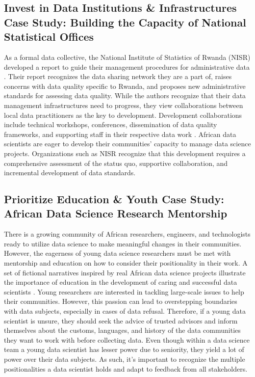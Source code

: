 \subsection{Invest in Data Institutions \& Infrastructures Case Study: Building the Capacity of National Statistical Offices}
As a formal data collective, the National Institute of Statistics of Rwanda (NISR) developed a report to guide their management procedures for administrative data \cite{habimana2018guidelines}. Their report recognizes the data sharing network they are a part of, raises concerns with data quality specific to Rwanda, and proposes new administrative standards for assessing data quality. While the authors recognize that their data management infrastructures need to progress, they view collaborations between local data practitioners as the key to development. Development collaborations include technical workshops, conferences, dissemination of data quality frameworks, and supporting staff in their respective data work \cite{habimana2018guidelines}. African data scientists are eager to develop their communities' capacity to manage data science projects. Organizations such as NISR recognize that this development requires a comprehensive assessment of the status quo, supportive collaboration, and incremental development of data standards.

\subsection{Prioritize Education \& Youth Case Study: African Data Science Research Mentorship}
There is a growing community of African researchers, engineers, and technologists ready to utilize data science to make meaningful changes in their communities. However, the eagerness of young data science researchers must be met with mentorship and education on how to consider their positionality in their work. A set of fictional narratives inspired by real African data science projects illustrate the importance of education in the development of caring and successful data scientists \cite{abebe2021narratives}. Young researchers are interested in tackling large-scale issues to help their communities. However, this passion can lead to overstepping boundaries with data subjects, especially in cases of data refusal. Therefore, if a young data scientist is unsure, they should seek the advice of trusted advisors and inform themselves about the customs, languages, and history of the data communities they want to work with before collecting data. Even though within a data science team a young data scientist has lesser power due to seniority, they yield a lot of power over their data subjects. As such, it's important to recognize the multiple positionalities a data scientist holds and adapt to feedback from all stakeholders. 


